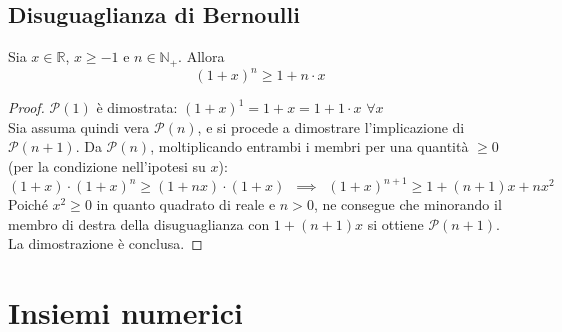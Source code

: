 \documentclass[10pt, oneside]{book}
\theoremstyle{plain}
\begin{document}
\subsection{Disuguaglianza di Bernoulli}
\begin{prop}
    Sia $x \in \mathbb{R}$, $x \geq -1$ e $n \in \mathbb{N}_+$. Allora
    \[(1+x)^n \geq 1 + n\cdot x\]
\end{prop}
\begin{proof}
$\mathcal{P}(1)$ è dimostrata: $(1 + x)^1 = 1 + x = 1 + 1 \cdot x$ $\forall x$
\\Sia assuma quindi vera $\mathcal{P}(n)$, e si procede a dimostrare l'implicazione di $\mathcal{P}(n+1)$. Da $\mathcal{P}(n)$, moltiplicando entrambi i membri per una quantità $\geq 0$ (per la condizione nell'ipotesi su $x$):
\[(1 + x) \cdot (1 + x)^n \geq (1 + n x) \cdot (1+x) \enspace \implies \enspace (1+x)^{n+1} \geq 1 + (n+1) x + n x^2\]
Poiché $x^2 \geq 0$ in quanto quadrato di reale e $n > 0$, ne consegue che minorando il membro di destra della disuguaglianza con $1 + (n+1) x$ si ottiene $\mathcal{P}(n+1)$. La dimostrazione è conclusa.
\end{proof}

\section{Insiemi numerici}
\end{document}
